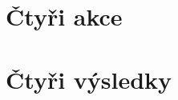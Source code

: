 \documentclass[../main.tex]{subfiles}
\begin{document}
\section{Čtyři akce}
\label{sec:4-akce}

\section{Čtyři výsledky}
\label{sec:4-vysledky}
\end{document}
